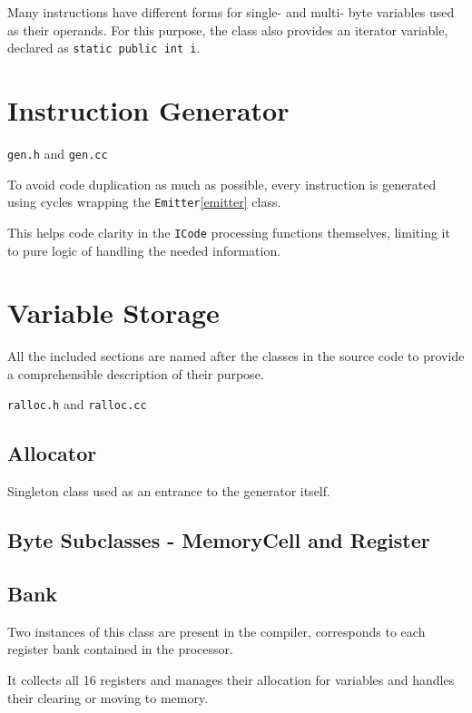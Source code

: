         Many instructions have different forms for single- and multi- byte variables used as their operands. For this purpose, the class also provides an iterator variable, declared as \texttt{static public int i}.

    \section{Instruction Generator}

    \texttt{gen.h} and \texttt{gen.cc}

    To avoid code duplication as much as possible, every instruction is generated using cycles wrapping the \texttt{Emitter}\ref{emitter} class.

    This helps code clarity in the \texttt{ICode} processing functions themselves, limiting it to pure logic of handling the needed information.

    \section{Variable Storage}

    All the included sections are named after the classes in the source code to provide a comprehensible description of their purpose.

    \texttt{ralloc.h} and \texttt{ralloc.cc}

        \subsection{Allocator}

        Singleton class used as an entrance to the generator itself.

        \subsection{Byte Subclasses - MemoryCell and Register}

        \subsection{Bank}

        Two instances of this class are present in the compiler, corresponds to each register bank contained in the processor.

        It collects all 16 registers and manages their allocation for variables and handles their clearing or moving to memory.

